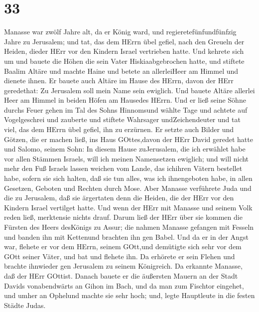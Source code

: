 \hypertarget{section-32}{%
\section{33}\label{section-32}}

 Manasse war zwölf Jahre alt, da er König ward, und
regieretefünfundfünfzig Jahre zu Jerusalem;  und tat, das
dem HErrn übel gefiel, nach den Greueln der Heiden, dieder HErr vor den
Kindern Israel vertrieben hatte.  Und kehrete sich um und
bauete die Höhen die sein Vater Hiskiaabgebrochen hatte, und stiftete
Baalim Altäre und machte Haine und betete an allerleiHeer am Himmel und
dienete ihnen.  Er bauete auch Altäre im Hause des HErrn,
davon der HErr geredethat: Zu Jerusalem soll mein Name sein ewiglich.
 Und bauete Altäre allerlei Heer am Himmel in beiden Höfen
am Hausedes HErrn.  Und er ließ seine Söhne durchs Feuer
gehen im Tal des Sohns Hinnomsund wählte Tage und achtete auf
Vogelgeschrei und zauberte und stiftete Wahrsager undZeichendeuter und
tat viel, das dem HErrn übel gefiel, ihn zu erzürnen.  Er
setzte auch Bilder und Götzen, die er machen ließ, ins Haus GOttes,davon
der HErr David geredet hatte und Salomo, seinem Sohn: In diesem Hause
zuJerusalem, die ich erwählet habe vor allen Stämmen Israels, will ich
meinen Namensetzen ewiglich;  und will nicht mehr den Fuß
Israels lassen weichen vom Lande, das ichihren Vätern bestellet habe,
sofern sie sich halten, daß sie tun alles, was ich ihnengeboten habe, in
allen Gesetzen, Geboten und Rechten durch Mose.  Aber
Manasse verführete Juda und die zu Jerusalem, daß sie ärgertaten denn
die Heiden, die der HErr vor den Kindern Israel vertilget hatte.
 Und wenn der HErr mit Manasse und seinem Volk reden ließ,
merktensie nichts drauf.  Darum ließ der HErr über sie
kommen die Fürsten des Heers desKönigs zu Assur; die nahmen Manasse
gefangen mit Fesseln und banden ihn mit Kettenund brachten ihn gen
Babel.  Und da er in der Angst war, flehete er vor dem
HErrn, seinem GOtt,und demütigte sich sehr vor dem GOtt seiner Väter,
 und bat und flehete ihn. Da erhörete er sein Flehen und
brachte ihnwieder gen Jerusalem zu seinem Königreich. Da erkannte
Manasse, daß der HErr GOttist.  Danach bauete er die
äußersten Mauern an der Stadt Davids vonabendwärts an Gihon im Bach, und
da man zum Fischtor eingehet, und umher an Ophelund machte sie sehr
hoch; und, legte Hauptleute in die festen Städte Judas. 
